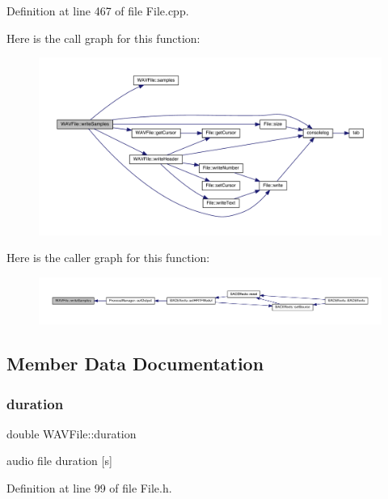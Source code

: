 Definition at line 467 of file File.\+cpp.

Here is the call graph for this function\+:
\nopagebreak
\begin{figure}[H]
\begin{center}
\leavevmode
\includegraphics[width=350pt]{class_w_a_v_file_aa0f1b604b4ff5c00ee84dfd4851ad2f9_cgraph}
\end{center}
\end{figure}
Here is the caller graph for this function\+:
\nopagebreak
\begin{figure}[H]
\begin{center}
\leavevmode
\includegraphics[width=350pt]{class_w_a_v_file_aa0f1b604b4ff5c00ee84dfd4851ad2f9_icgraph}
\end{center}
\end{figure}


\subsection{Member Data Documentation}
\mbox{\label{class_w_a_v_file_a4435a31465f66b639ad5f403c38ee093}} 
\subsubsection{\texorpdfstring{duration}{duration}}
{\footnotesize\ttfamily double W\+A\+V\+File\+::duration}

audio file duration \mbox{[}s\mbox{]} 

Definition at line 99 of file File.\+h.

